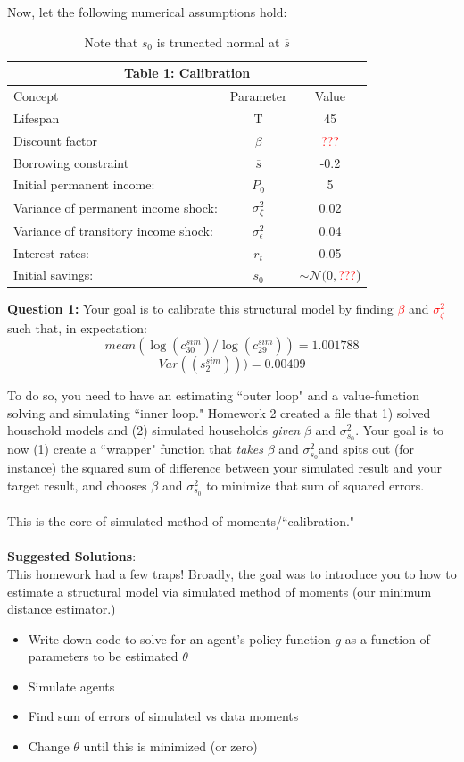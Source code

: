 \documentclass[11pt]{article}
\begin{document}
Now, let the following numerical assumptions hold:
\begin{table}[ht!]
\centering
\begin{tabular}{lcc}
\hline
\hline
\multicolumn{3}{c}{Table 1: Calibration}\\
\hline
Concept & Parameter & Value \\ 
Lifespan & T & 45 \\
Discount factor & $\beta$ & \textcolor{red}{???}\\
Borrowing constraint & $\overline{s}$ & -0.2 \\
Initial permanent income:  & $P_0$ & 5\\
Variance of permanent income shock:  & $\sigma^2_\zeta$ & 0.02\\
Variance of transitory income shock:  & $\sigma^2_\epsilon$ & 0.04\\
Interest rates:  & $r_{t}$ & 0.05\\
Initial savings:  & $s_{0}$ & $\sim\mathcal{N}(0,$\textcolor{red}{???})\\
\hline
\hline
\end{tabular}
\caption{Note that $s_0$ is truncated normal at $\overline{s}$}
\end{table}

\textbf{Question 1:}   Your goal is to calibrate this structural model by finding {\textcolor{red}{$\beta$}} and {\textcolor{red}{$\sigma^2_\zeta$}}  such that, in expectation:
$$mean(\log(c_{30}^{sim})/\log(c_{29}^{sim}))=1.001788$$
$$Var((s_2^{sim})))=0.00409$$

To do so, you need to have an estimating ``outer loop" and a value-function solving and simulating ``inner loop."  Homework 2 created a file that 1) solved household models and (2) simulated households \emph{given}  $\beta$ and $\sigma^2_{s_0}$.  Your goal is to now (1) create a ``wrapper" function that \emph{takes}  $\beta$ and $\sigma^2_{s_0}$and spits out (for instance) the squared sum of difference between your simulated result and your target result, and chooses  $\beta$ and $\sigma^2_{s_0}$ to minimize that sum of squared errors.\\
\ \\
This is the core of simulated method of moments/``calibration."  \ \\
\ \\
\textbf{Suggested Solutions}:\\

This homework had a few traps!  Broadly, the goal was to introduce you to how to estimate a structural model via simulated method of moments (our minimum distance estimator.)
\begin{itemize}
\item Write down code to solve for an agent's policy function $g$ as a function of parameters to be estimated $\theta$
\item Simulate agents 
\item Find sum of errors of simulated vs data moments
\item Change $\theta$ until this is minimized (or zero)
\end{itemize}
\end{document}
